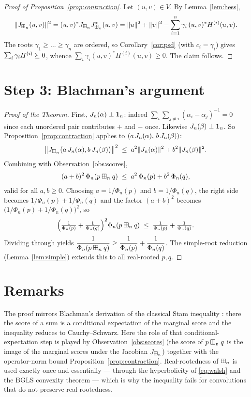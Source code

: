 \documentclass[11pt]{article}
\begin{document}
\begin{proof}[Proof of Proposition~\ref{prop:contraction}]
Let $(u,v)\in V$. By Lemma~\ref{lem:hess},
\[
\|J_{\boxplus_n}(u,v)\|^2=(u,v)^\ast J_{\boxplus_n}J_{\boxplus_n}^\ast(u,v)
=\|u\|^2+\|v\|^2-\sum_{i=1}^n\gamma_i\,(u,v)^\ast H^{(i)}(u,v).
\]
The roots $\gamma_1\ge\dots\ge\gamma_n$ are ordered, so
Corollary~\ref{cor:psd} (with $c_i=\gamma_i$) gives $\sum_i\gamma_i H^{(i)}\succeq 0$,
whence $\sum_i\gamma_i(u,v)^\ast H^{(i)}(u,v)\ge0$. The claim follows.
\end{proof}

\section*{Step 3: Blachman's argument}

\begin{proof}[Proof of the Theorem]
First, $J_n(\alpha)\perp\mathbf 1_n$: indeed
$\sum_i\sum_{j\ne i}(\alpha_i-\alpha_j)^{-1}=0$ since each unordered pair
contributes $+$ and $-$ once. Likewise $J_n(\beta)\perp\mathbf 1_n$. So
Proposition~\ref{prop:contraction} applies to
$(a\,J_n(\alpha),\,b\,J_n(\beta))$:
\[
\bigl\|J_{\boxplus_n}\bigl(a\,J_n(\alpha),b\,J_n(\beta)\bigr)\bigr\|^2
\;\le\;a^2\|J_n(\alpha)\|^2+b^2\|J_n(\beta)\|^2 .
\]
Combining with Observation~\ref{obs:scores},
\[
(a+b)^2\,\Phi_n(p\boxplus_n q)\;\le\;a^2\,\Phi_n(p)+b^2\,\Phi_n(q),
\]
valid for all $a,b\ge0$. Choosing $a=1/\Phi_n(p)$ and $b=1/\Phi_n(q)$, the right
side becomes $1/\Phi_n(p)+1/\Phi_n(q)$ and the factor $(a+b)^2$ becomes
$\bigl(1/\Phi_n(p)+1/\Phi_n(q)\bigr)^2$, so
\[
\Bigl(\tfrac{1}{\Phi_n(p)}+\tfrac{1}{\Phi_n(q)}\Bigr)^2\Phi_n(p\boxplus_n q)
\;\le\;\tfrac{1}{\Phi_n(p)}+\tfrac{1}{\Phi_n(q)} .
\]
Dividing through yields
$\dfrac{1}{\Phi_n(p\boxplus_n q)}\ge\dfrac{1}{\Phi_n(p)}+\dfrac{1}{\Phi_n(q)}$.
The simple-root reduction (Lemma~\ref{lem:simple}) extends this to all
real-rooted $p,q$.
\end{proof}

\section*{Remarks}

The proof mirrors Blachman's \cite{Blachman} derivation of the classical Stam
inequality \cite{Stam}: there the score of a sum is a conditional expectation of
the marginal score and the inequality reduces to Cauchy--Schwarz. Here the role
of that conditional-expectation step is played by
Observation~\ref{obs:scores} (the score of $p\boxplus_n q$ is the image of the marginal
scores under the Jacobian $J_{\boxplus_n}$) together with the operator-norm bound
Proposition~\ref{prop:contraction}. Real-rootedness of $\boxplus_n$ is used exactly
once and essentially — through the hyperbolicity of \eqref{eq:walsh} and the
BGLS convexity theorem — which is why the inequality fails for convolutions that
do not preserve real-rootedness.
\end{document}
